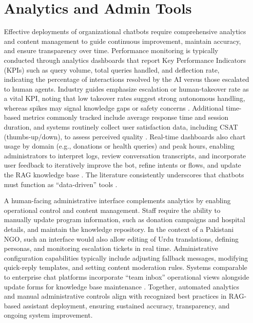 \section{Analytics and Admin Tools}
Effective deployments of organizational chatbots require comprehensive analytics and content management to guide continuous improvement, maintain accuracy, and ensure transparency over time. Performance monitoring is typically conducted through analytics dashboards that report Key Performance Indicators (KPIs) such as query volume, total queries handled, and deflection rate, indicating the percentage of interactions resolved by the AI versus those escalated to human agents. Industry guides emphasize escalation or human-takeover rate as a vital KPI, noting that low takeover rates suggest strong autonomous handling, whereas spikes may signal knowledge gaps or safety concerns \cite{freshworks2024analytics}. Additional time-based metrics commonly tracked include average response time and session duration, and systems routinely collect user satisfaction data, including CSAT (thumbs-up/down), to assess perceived quality \cite{freshworks2024analytics}. Real-time dashboards also chart usage by domain (e.g., donations or health queries) and peak hours, enabling administrators to interpret logs, review conversation transcripts, and incorporate user feedback to iteratively improve the bot, refine intents or flows, and update the RAG knowledge base \cite{freshworks2024analytics}. The literature consistently underscores that chatbots must function as “data-driven” tools \cite{freshworks2024analytics}.

A human-facing administrative interface complements analytics by enabling operational control and content management. Staff require the ability to manually update program information, such as donation campaigns and hospital details, and maintain the knowledge repository. In the context of a Pakistani NGO, such an interface would also allow editing of Urdu translations, defining personas, and monitoring escalation tickets in real time. Administrative configuration capabilities typically include adjusting fallback messages, modifying quick-reply templates, and setting content moderation rules. Systems comparable to enterprise chat platforms incorporate “team inbox” operational views alongside update forms for knowledge base maintenance \cite{wati2024aisupport}. Together, automated analytics and manual administrative controls align with recognized best practices in RAG-based assistant deployment, ensuring sustained accuracy, transparency, and ongoing system improvement.

